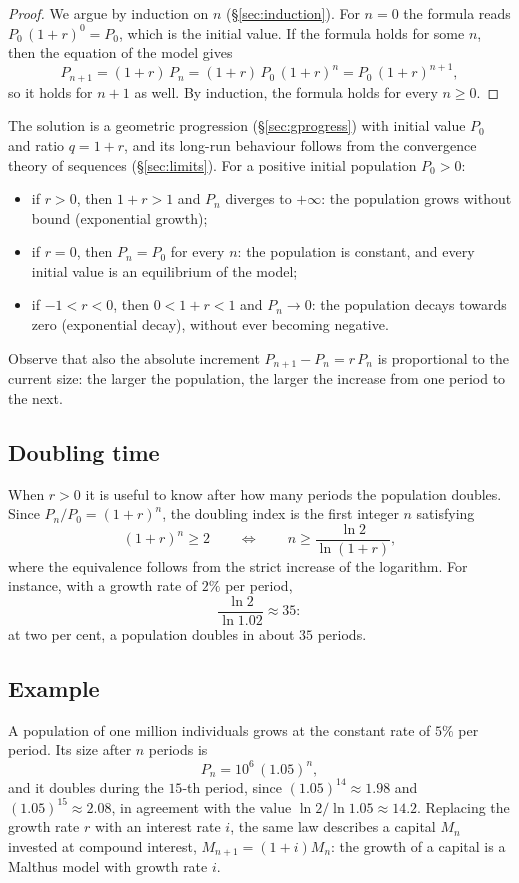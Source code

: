 \documentclass[11pt,a4paper]{article}
\theoremstyle{definition} \newtheorem{definition}{Definition} \theoremstyle{plain} \newtheorem{theorem}{Theorem}
\begin{document}
\begin{proof} We argue by induction on $n$ (\S\ref{sec:induction}). For $n=0$ the formula
reads $P_0\,(1+r)^0 = P_0$, which is the initial value. If the formula
holds for some $n$, then the equation of the model gives
\[ P_{n+1} = (1+r)\,P_n = (1+r)\,P_0\,(1+r)^n = P_0\,(1+r)^{n+1}, \]
so it holds for $n+1$ as well. By induction, the formula holds for every
$n \ge 0$. \end{proof}

The solution is a geometric progression (\S\ref{sec:gprogress}) with initial value $P_0$
and ratio $q=1+r$, and its long-run behaviour follows from the
convergence theory of sequences (\S\ref{sec:limits}). For a positive initial population
$P_0>0$:
\begin{itemize}
\item if $r>0$, then $1+r>1$ and $P_n$ diverges to $+\infty$: the
population grows without bound (exponential growth);
\item if $r=0$, then $P_n=P_0$ for every $n$: the population is constant,
and every initial value is an equilibrium of the model;
\item if $-1<r<0$, then $0<1+r<1$ and $P_n\to 0$: the population decays
towards zero (exponential decay), without ever becoming negative.
\end{itemize}
Observe that also the absolute increment $P_{n+1}-P_n = r\,P_n$ is
proportional to the current size: the larger the population, the larger
the increase from one period to the next.

\subsection*{Doubling time}

When $r>0$ it is useful to know after how many periods the population
doubles. Since $P_n/P_0 = (1+r)^n$, the doubling index is the first
integer $n$ satisfying
\[ (1+r)^n \ge 2
   \qquad\Longleftrightarrow\qquad
   n \ge \frac{\ln 2}{\ln(1+r)}, \]
where the equivalence follows from the strict increase of the logarithm.
For instance, with a growth rate of $2\%$ per period,
\[ \frac{\ln 2}{\ln 1.02} \approx 35: \]
at two per cent, a population doubles in about $35$ periods.

\subsection*{Example}

A population of one million individuals grows at the constant rate of
$5\%$ per period. Its size after $n$ periods is
\[ P_n = 10^6\,(1.05)^n, \]
and it doubles during the $15$-th period, since $(1.05)^{14}\approx 1.98$
and $(1.05)^{15}\approx 2.08$, in agreement with the value
$\ln 2/\ln 1.05 \approx 14.2$. Replacing the growth rate $r$ with an
interest rate $i$, the same law describes a capital $M_n$ invested at
compound interest, $M_{n+1}=(1+i)M_n$: the growth of a capital is a
Malthus model with growth rate $i$.
\end{document}
